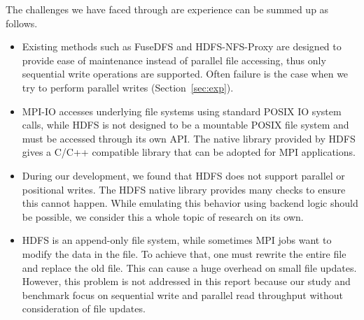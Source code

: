 The challenges we have faced through are experience can be summed up as follows.
\begin{itemize}
\item Existing methods such as FuseDFS and HDFS-NFS-Proxy are designed to provide ease of
	maintenance instead of parallel file accessing, thus only sequential
	write operations are supported. Often failure is the case when we try to
	perform parallel writes (Section~\ref{sec:exp}). 
\item MPI-IO accesses underlying file systems using standard POSIX IO system
	calls, while HDFS is not designed to be a mountable POSIX file system
	and must be accessed through its own API. The native library provided by
	HDFS gives a C/C++ compatible library that can be adopted for MPI
	applications.
\item During our development, we found that HDFS does not support 
	parallel or positional writes. The HDFS native library provides many
	checks to ensure this cannot happen. While emulating this behavior
	using backend logic should be possible, we consider this a whole topic of
	research on its own.
\item HDFS is an append-only file system, while sometimes MPI jobs want to
	modify the data in the file. To achieve that, one must rewrite the
	entire file and replace the old file. This can cause a huge overhead on
	small file updates. However, this problem is not addressed in this
	report because our study and benchmark focus on sequential write and
	parallel read throughput without consideration of file updates.
\end{itemize}

